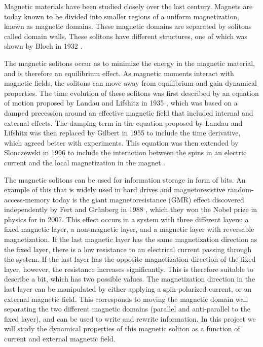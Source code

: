 \documentclass[12pt, a4paper]{article}		%
\numberwithin{equation}{section}
\begin{document}
Magnetic materials have been studied closely over the last century. Magnets are today known to be divided into smaller regions of a uniform magnetization, known as magnetic domains. These magnetic domains are separated by solitons called domain walls. These solitons have different structures, one of which was shown by Bloch in 1932 \cite{Bloch1932}. 

The magnetic solitons occur as to minimize the energy in the magnetic material, and is therefore an equilibrium effect. As magnetic moments interact with magnetic fields, the solitons can move away from equilibrium and gain dynamical properties. The time evolution of these solitons was first described by an equation of motion proposed by Landau and Lifshitz in 1935 \cite{LandauLifshitz1935}, which was based on a damped precession around an effective magnetic field that included internal and external effects. The damping term in the equation proposed by Landau and Lifshitz was then replaced by Gilbert in 1955 \cite{Gilbert2004Classics} to include the time derivative, which agreed better with experiments. This equation was then extended by Slonczewski in 1996 to include the interaction between the spins in an electric current and the local magnetization in the magnet \cite{Slonczewski1996}.

The magnetic solitons can be used for information storage in form of bits. An example of this that is widely used in hard drives and magnetoresistive random-access-memory today is the giant magnetoresistance (GMR) effect discovered independently by Fert and Gr\"{u}nberg in 1988 \cite{Fert1988} \cite{Grunberg1989}, which they won the Nobel prize in physics for in 2007. This effect occurs in a system with three different layers; a fixed magnetic layer, a non-magnetic layer, and a magnetic layer with reversable magnetization. If the last magnetic layer has the same magnetization direction as the fixed layer, there is a low resistance to an electrical current passing through the system. If the last layer has the opposite magnetization direction of the fixed layer, however, the resistance increases significantly. This is therefore suitable to describe a bit, which has two possible values. The magnetization direction in the last layer can be manipulated by either applying a spin-polarized current, or an external magnetic field. This corresponds to moving the magnetic domain wall separating the two different magnetic domains (parallel and anti-parallel to the fixed layer), and can be used to write and rewrite information. In this project we will study the dynamical properties of this magnetic soliton as a function of current and external magnetic field.
\end{document}

